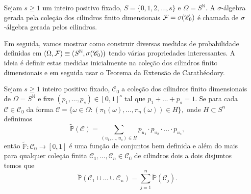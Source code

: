 \begin{definicao}
Sejam $s\geq 1$ um inteiro positivo fixado, $S=\{0,1,2,\ldots,s\}$ 
e $\Omega=S^{\mathbb{N}}$. A $\sigma$-álgebra gerada pela coleção
dos cilindros finito dimensionais $\mathcal{F} =\sigma(\mathscr{C}_0)$ 
é chamada de $\sigma$-álgebra gerada pelos cilindros.
\end{definicao}

Em seguida, vamos mostrar como construir diversas medidas 
de probabilidade definidas em 
$(\Omega,\mathcal{F})\equiv (S^{\mathbb{N}},\sigma(\mathscr{C}_0))$ 
tendo várias
propriedades interessantes. A ideia é definir estas medidas
inicialmente na coleção dos cilindros finito dimensionais 
e em seguida usar o Teorema da Extensão de Carathéodory.





\begin{proposicao}
Sejam $s\geq 1$ inteiro positivo fixado,
$\mathscr{C}_0$ a coleção dos cilindros finito 
dimensionais de $\Omega=S^{\mathbb{N}}$
e fixe $(p_1,\ldots,p_s)\in [0,1]^s$ tal que 
$p_1+\ldots +p_s=1$. 
Se para cada $\mathcal{C}\in\mathscr{C}_0$
da forma 
$
\mathcal{C}
=
\{
\omega\in \Omega:
(\pi_1(\omega), \ldots,\pi_n(\omega)) \in H
\},
$
onde $H\subset S^n$ definimos
\[
\widetilde{\mathbb{P}}(\mathcal{C}) 
=
\sum_{(u_1,\ldots,u_s)\in H} 
p_{u_1}\cdot p_{u_2}\cdot\ldots\cdot p_{u_s},
\]
então $\widetilde{\mathbb{P}}:\mathscr{C}_0\to [0,1]$ é uma função 
de conjuntos bem definida e além do mais para qualquer coleção
finita $\mathcal{C}_1,\ldots,\mathcal{C}_n\in\mathscr{C}_0$
de cilindros dois a dois disjuntos temos que 
\begin{equation}\label{prop-finitamente-aditiva-med-prod-SN}
\widetilde{\mathbb{P}}(\mathcal{C}_1\cup\ldots\cup \mathcal{C}_n)
=
\sum_{j=1}^n \widetilde{\mathbb{P}}(\mathcal{C}_j).
\end{equation}
\end{proposicao}



